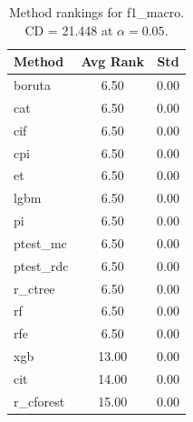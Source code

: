 \begin{table}[h]
\centering
\caption{Method rankings for f1_macro. CD = 21.448 at $\alpha=0.05$.}
\label{tab:ranks_f1_macro}
\begin{tabular}{lcc}
\toprule
Method & Avg Rank & Std \\
\midrule
boruta & 6.50 & 0.00 \\
cat & 6.50 & 0.00 \\
cif & 6.50 & 0.00 \\
cpi & 6.50 & 0.00 \\
et & 6.50 & 0.00 \\
lgbm & 6.50 & 0.00 \\
pi & 6.50 & 0.00 \\
ptest_mc & 6.50 & 0.00 \\
ptest_rdc & 6.50 & 0.00 \\
r_ctree & 6.50 & 0.00 \\
rf & 6.50 & 0.00 \\
rfe & 6.50 & 0.00 \\
xgb & 13.00 & 0.00 \\
cit & 14.00 & 0.00 \\
r_cforest & 15.00 & 0.00 \\
\bottomrule
\end{tabular}
\end{table}